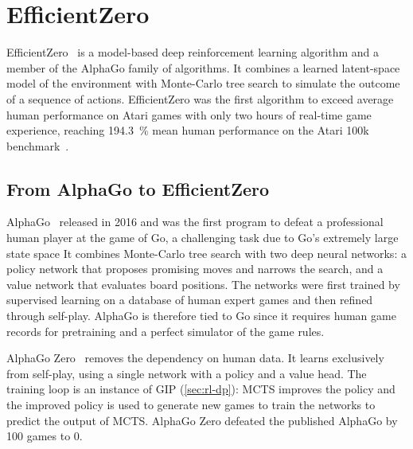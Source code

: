 
\chapter{EfficientZero}\label{chap:efficientzero}


EfficientZero~\cite{ye_mastering_2021} is a model-based deep reinforcement
learning algorithm and a member of the AlphaGo family of algorithms.
It combines a learned latent-space model of the environment with Monte-Carlo
tree search to simulate the outcome of a sequence of actions.
EfficientZero was the first algorithm to exceed average human performance on
Atari games with only two hours of real-time game experience, reaching
\SI{194.3}{\percent} mean human performance on the Atari 100k
benchmark~\cite{ye_mastering_2021}.

\section{From AlphaGo to EfficientZero}\label{sec:ez-lineage}

AlphaGo~\cite{silver_mastering_2016} released in 2016 and was the first program to defeat a
professional human player at the game of Go, a challenging task due to Go's extremely large state space
It combines Monte-Carlo tree search with two deep neural networks: a policy
network that proposes promising moves and narrows the search, and a value
network that evaluates board positions.
The networks were first trained by supervised learning on a database of human
expert games and then refined through self-play.
AlphaGo is therefore tied to Go since it requires human game records for
pretraining and a perfect simulator of the game rules.

AlphaGo Zero~\cite{silver_mastering_2017-1} removes the dependency on human
data.
It learns exclusively from self-play, using a single network with a policy and a value head.
The training loop is an instance of GIP (\cref{sec:rl-dp}): MCTS improves
the policy and the improved policy is used to generate new games to train the
networks to predict the output of MCTS.
AlphaGo Zero defeated the published AlphaGo by 100 games to 0.

